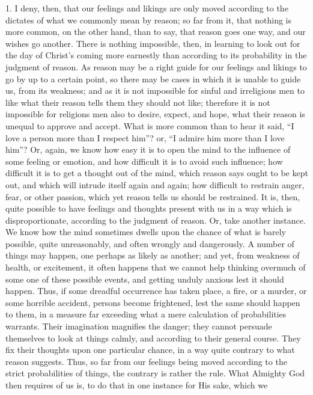 1. I deny, then, that our feelings and likings are only moved
according to the dictates of what we commonly mean by reason; so far
from it, that nothing is more common, on the other hand, than to say,
that reason goes one way, and our wishes go another. There is nothing
impossible, then, in learning to look out for the day of Christ's
coming more earnestly than according to its probability in the
judgment of reason. As reason may be a right guide for our feelings
and likings to go by up to a certain point, so there may be cases in
which it is unable to guide us, from its weakness; and as it is not
impossible for sinful and irreligious men to like what their reason
tells them they should not like; therefore it is not impossible for
religions men also to desire, expect, and hope, what their reason is
unequal to approve and accept. What is more common than to hear it
said, ``I love a person more than I respect him''? or, ``I
admire him more than I love him''? Or, again, we know how easy it
is to open the mind to the influence of some feeling or emotion, and
how difficult it is to avoid such influence; how difficult it is to
get a thought out of the mind, which reason says ought to be kept out,
and which will intrude itself again and again; how difficult to
restrain anger, fear, or other passion, which yet reason tells us
should be restrained. It is, then, quite possible to have feelings and
thoughts present with us in a way which is disproportionate, according
to the judgment of reason. Or, take another instance. We know how the
mind sometimes dwells upon the chance of what is barely possible,
quite unreasonably, and often wrongly and dangerously. A number of
things may happen, one perhaps as likely as another; and yet, from
weakness of health, or excitement, it often happens that we cannot
help thinking overmuch of some one of these possible events, and
getting unduly anxious lest it should happen. Thus, if some dreadful
occurrence has taken place, a fire, or a murder, or some horrible
accident, persons become frightened, lest the same should happen to
them, in a measure far exceeding what a mere calculation of
probabilities warrants. Their imagination magnifies the danger; they
cannot persuade themselves to look at things calmly, and according to
their general course. They fix their thoughts upon one particular
chance, in a way quite contrary to what reason suggests. Thus, so far
from our feelings being moved according to the strict probabilities of
things, the contrary is rather the rule. What Almighty God then
requires of us is, to do that in one instance for His sake, which we
